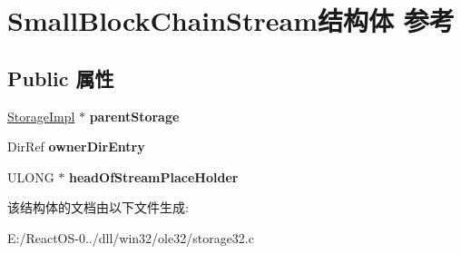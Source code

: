\hypertarget{struct_small_block_chain_stream}{}\section{Small\+Block\+Chain\+Stream结构体 参考}
\label{struct_small_block_chain_stream}
\subsection*{Public 属性}
\begin{DoxyCompactItemize}
\item 
\mbox{\label{struct_small_block_chain_stream_a6d01e09c55ddc7c8f2d967681eae72c2}} 
\hyperlink{struct_storage_impl}{Storage\+Impl} $\ast$ {\bfseries parent\+Storage}
\item 
\mbox{\label{struct_small_block_chain_stream_a432680a743979767bf4c4e7175aa905c}} 
Dir\+Ref {\bfseries owner\+Dir\+Entry}
\item 
\mbox{\label{struct_small_block_chain_stream_a23b9fa762272c8a91c91d447696473aa}} 
U\+L\+O\+NG $\ast$ {\bfseries head\+Of\+Stream\+Place\+Holder}
\end{DoxyCompactItemize}


该结构体的文档由以下文件生成\+:\begin{DoxyCompactItemize}
\item 
E\+:/\+React\+O\+S-\/0../dll/win32/ole32/storage32.\+c\end{DoxyCompactItemize}
